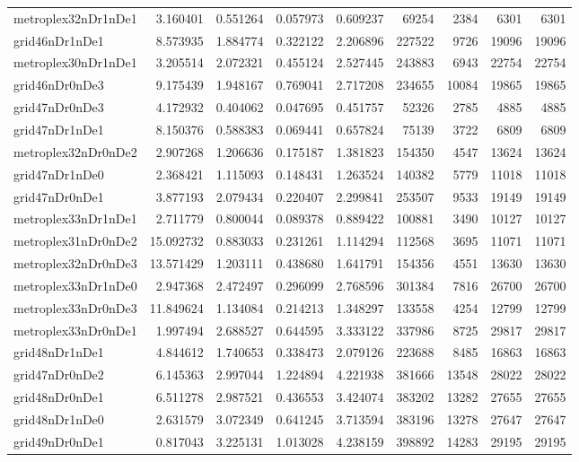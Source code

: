 \documentclass[../../../thesis.tex]{subfiles}
\begin{document}
\begin{longtable}{|l|r|r|r|r|r|r|r|r|}
metroplex32nDr1nDe1 & 3.160401 & 0.551264 & 0.057973 & 0.609237 & 69254 & 2384 & 6301 & 6301 \\
grid46nDr1nDe1 & 8.573935 & 1.884774 & 0.322122 & 2.206896 & 227522 & 9726 & 19096 & 19096 \\
metroplex30nDr1nDe1 & 3.205514 & 2.072321 & 0.455124 & 2.527445 & 243883 & 6943 & 22754 & 22754 \\
grid46nDr0nDe3 & 9.175439 & 1.948167 & 0.769041 & 2.717208 & 234655 & 10084 & 19865 & 19865 \\
grid47nDr0nDe3 & 4.172932 & 0.404062 & 0.047695 & 0.451757 & 52326 & 2785 & 4885 & 4885 \\
grid47nDr1nDe1 & 8.150376 & 0.588383 & 0.069441 & 0.657824 & 75139 & 3722 & 6809 & 6809 \\
metroplex32nDr0nDe2 & 2.907268 & 1.206636 & 0.175187 & 1.381823 & 154350 & 4547 & 13624 & 13624 \\
grid47nDr1nDe0 & 2.368421 & 1.115093 & 0.148431 & 1.263524 & 140382 & 5779 & 11018 & 11018 \\
grid47nDr0nDe1 & 3.877193 & 2.079434 & 0.220407 & 2.299841 & 253507 & 9533 & 19149 & 19149 \\
metroplex33nDr1nDe1 & 2.711779 & 0.800044 & 0.089378 & 0.889422 & 100881 & 3490 & 10127 & 10127 \\
metroplex31nDr0nDe2 & 15.092732 & 0.883033 & 0.231261 & 1.114294 & 112568 & 3695 & 11071 & 11071 \\
metroplex32nDr0nDe3 & 13.571429 & 1.203111 & 0.438680 & 1.641791 & 154356 & 4551 & 13630 & 13630 \\
metroplex33nDr1nDe0 & 2.947368 & 2.472497 & 0.296099 & 2.768596 & 301384 & 7816 & 26700 & 26700 \\
metroplex33nDr0nDe3 & 11.849624 & 1.134084 & 0.214213 & 1.348297 & 133558 & 4254 & 12799 & 12799 \\
metroplex33nDr0nDe1 & 1.997494 & 2.688527 & 0.644595 & 3.333122 & 337986 & 8725 & 29817 & 29817 \\
grid48nDr1nDe1 & 4.844612 & 1.740653 & 0.338473 & 2.079126 & 223688 & 8485 & 16863 & 16863 \\
grid47nDr0nDe2 & 6.145363 & 2.997044 & 1.224894 & 4.221938 & 381666 & 13548 & 28022 & 28022 \\
grid48nDr0nDe1 & 6.511278 & 2.987521 & 0.436553 & 3.424074 & 383202 & 13282 & 27655 & 27655 \\
grid48nDr1nDe0 & 2.631579 & 3.072349 & 0.641245 & 3.713594 & 383196 & 13278 & 27647 & 27647 \\
grid49nDr0nDe1 & 0.817043 & 3.225131 & 1.013028 & 4.238159 & 398892 & 14283 & 29195 & 29195 \\

\end{longtable}
\end{document}

